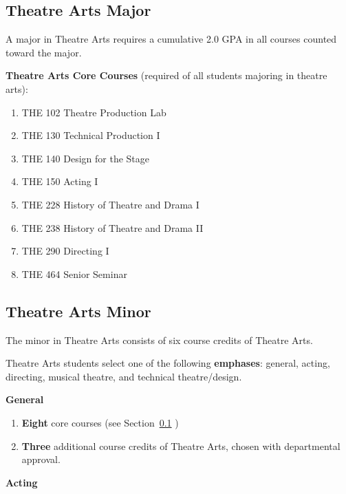 \documentclass[
  letterpaper,
]{scrbook}
\begin{document}
\subsection{Theatre Arts Major}\label{sec-theatre-arts-major}

A major in Theatre Arts requires a cumulative 2.0 GPA in all courses
counted toward the major.

\textbf{Theatre Arts Core Courses} (required of all students majoring in
theatre arts):

\begin{enumerate}
\def\labelenumi{\arabic{enumi}.}
\item
  THE 102 Theatre Production Lab
\item
  THE 130 Technical Production I
\item
  THE 140 Design for the Stage
\item
  THE 150 Acting I
\item
  THE 228 History of Theatre and Drama I
\item
  THE 238 History of Theatre and Drama II
\item
  THE 290 Directing I
\item
  THE 464 Senior Seminar
\end{enumerate}

\subsection{Theatre Arts Minor}\label{theatre-arts-minor}

The minor in Theatre Arts consists of six course credits of Theatre
Arts.

Theatre Arts students select one of the following \textbf{emphases}:
general, acting, directing, musical theatre, and technical
theatre/design.

\textbf{General}

\begin{enumerate}
\def\labelenumi{\arabic{enumi}.}
\item
  \textbf{Eight} core courses (see Section~\ref{sec-theatre-arts-major}
  )
\item
  \textbf{Three} additional course credits of Theatre Arts, chosen with
  departmental approval.
\end{enumerate}

\textbf{Acting}
\end{document}
